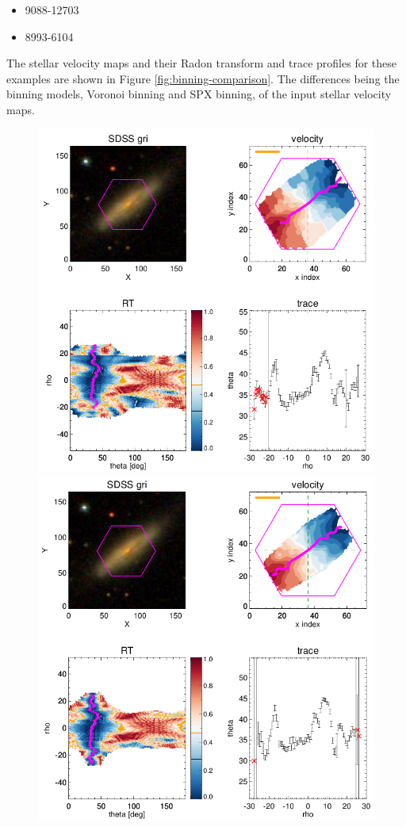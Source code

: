 \begin{itemize}
    \item 9088-12703
    \item 8993-6104
\end{itemize}

The stellar velocity maps and their Radon transform and trace profiles for these examples are shown in Figure \ref{fig:binning-comparison}. The differences being the binning models, Voronoi binning and SPX binning, of the input stellar velocity maps. 

\begin{figure}
    \centering
    \includegraphics[width=\columnwidth]{images/RadonPlots/RT-SNIPS-NEW/7977-12704-VOR10-MILESHC-MILESHC-1-SNIP.png}
    \includegraphics[width=\columnwidth]{images/RadonPlots/RT-SNIPS-NEW/7977-12704-SPX-MILESHC-MILESHC-1-SNIP.png}

\end{figure}
